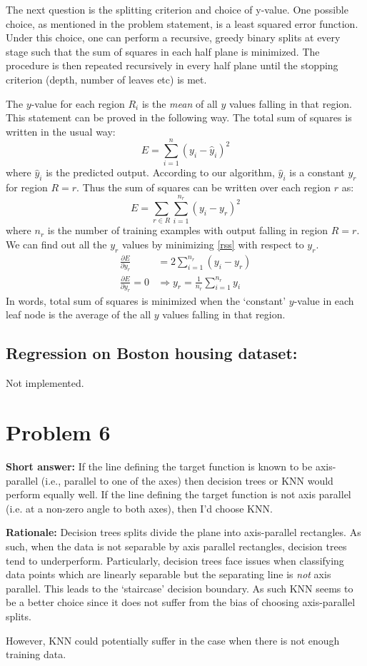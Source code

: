 \documentclass[10pt,letterpaper]{article}
\begin{document}
The next question is the splitting criterion and choice of y-value. One possible choice, as mentioned in the problem statement, is a least squared error function. Under this choice, one can perform a recursive, greedy binary splits at every stage such that the sum of squares in each half plane is minimized. The procedure is then repeated recursively in every half plane until the stopping criterion (depth, number of leaves etc) is met. 

The $y$-value for each region $R_i$ is the {\em mean} of all $y$ values falling in that region. This statement can be proved in the following way. The total sum of squares is written in the usual way:
\begin{equation}{E = \sum_{i=1}^n (y_i - \hat{y}_i)^2}
\end{equation}
where $\hat{y}_i$ is the predicted output. According to our algorithm, $\hat{y}_i$ is a constant $y_r$ for region $R = r$. Thus the sum of squares can be written over each region $r$ as:
\begin{equation}
  E = \sum_{r\in R}\sum_{i=1}^{n_r} (y_i - y_r)^2
  \label{rss}
\end{equation}
where $n_r$ is the number of training examples with output falling in region $R = r$. We can find out all the $y_r$ values by minimizing \eqref{rss} with respect to $y_r$.
\begin{align}
  \frac{\partial E}{\partial y_r} &= 2\sum_{i=1}^{n_r}(y_i-y_r) \nonumber \\
  \frac{\partial E}{\partial y_r} = 0 & \Rightarrow \boxed{y_r = \frac{1}{n_r}\sum_{i=1}^{n_r}y_i}
\end{align}
In words, total sum of squares is minimized when the `constant' $y$-value in each leaf node is the average of the all $y$ values falling in that region. 

\subsection{Regression on Boston housing dataset:} Not implemented.
\section{Problem 6}

{\bf Short answer:} If the line defining the target function is known to be axis-parallel (i.e., parallel to one of the axes) then decision trees or KNN would perform equally well. If the line defining the target function is not axis parallel (i.e. at a non-zero angle to both axes), then I'd choose KNN. 

{\bf Rationale:} Decision trees splits divide the plane into axis-parallel rectangles. As such, when the data is not separable by axis parallel rectangles, decision trees tend to underperform. Particularly, decision trees face issues when classifying data points which are linearly separable but the separating line is {\em not} axis parallel. This leads to the `staircase' decision boundary. As such KNN seems to be a better choice since it does not suffer from the bias of choosing axis-parallel splits.

However, KNN could potentially suffer in the case when there is not enough training data.
\end{document}
